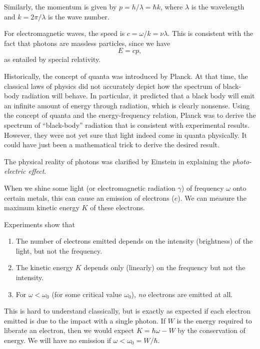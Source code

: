 \documentclass[a4paper]{article}
\begin{document}
Similarly, the momentum is given by $p = h/\lambda = \hbar k$, where $\lambda$ is the wavelength and $k = 2\pi/\lambda$ is the wave number.

For electromagnetic waves, the speed is $c = \omega/k = \nu\lambda$. This is consistent with the fact that photons are massless particles, since we have
\[
  E = cp,
\]
as entailed by special relativity.

Historically, the concept of quanta was introduced by Planck. At that time, the classical laws of physics did not accurately depict how the spectrum of black-body radiation will behave. In particular, it predicted that a black body will emit an infinite amount of energy through radiation, which is clearly nonsense. Using the concept of quanta and the energy-frequency relation, Planck was to derive the spectrum of ``black-body'' radiation that is consistent with experimental results. However, they were not yet sure that light indeed come in quanta physically. It could have just been a mathematical trick to derive the desired result.

The physical reality of photons was clarified by Einstein in explaining the \emph{photo-electric effect}.

When we shine some light (or electromagnetic radiation $\gamma$) of frequency $\omega$ onto certain metals, this can cause an emission of electrons ($e$). We can measure the maximum kinetic energy $K$ of these electrons.
\begin{center}
\end{center}
Experiments show that
\begin{enumerate}
  \item The number of electrons emitted depends on the intensity (brightness) of the light, but not the frequency.
  \item The kinetic energy $K$ depends only (linearly) on the frequency but not the intensity.
  \item For $\omega < \omega_0$ (for some critical value $\omega_0$), \emph{no} electrons are emitted at all.
\end{enumerate}
This is hard to understand classically, but is exactly as expected if each electron emitted is due to the impact with a single photon. If $W$ is the energy required to liberate an electron, then we would expect $K = \hbar \omega - W$ by the conservation of energy. We will have no emission if $\omega < \omega_0 = W/\hbar$.
\end{document}
